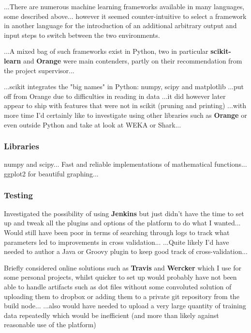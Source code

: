 ...There are numerous machine learning frameworks available in many languages,
some described above... however it seemed counter-intuitive to select a
framework in another language for the introduction of an additional arbitrary
output and input steps to switch between the two environments.

...A mixed bag of such frameworks exist in Python, two in particular
\textbf{scikit-learn}\citep{scikit-learn} and \textbf{Orange}\citep{orange}
were main contenders, partly on their recommendation from the project
supervisor...

...scikit integrates the "big names" in Python: numpy, scipy and matplotlib
...put off from Orange due to difficulties in reading in data ...it did however
later appear to ship with features that were not in scikit (pruning and
printing) ...with more time I'd certainly like to investigate using other
libraries such as \textbf{Orange} or even outside Python and take at look at WEKA
or Shark...

\subsubsection{Libraries}
numpy\citep{numpyscipy} and scipy\citep{scipy}... Fast and reliable implementations of
mathematical functions...  ggplot2\citep{ggplot2} for beautiful graphing...

\subsubsection{Testing}
Investigated the possibility of using \textbf{Jenkins}
but just didn't have the time to set up and tweak all the plugins and options of
the platform to do what I wanted... Would still have been poor in terms of
searching through logs to track what parameters led to improvements in cross
validation... ...Quite likely I'd have needed to author a Java or Groovy plugin
to keep good track of cross-validation...

Briefly considered online solutions such as \textbf{Travis} and \textbf{Wercker}
which I use for some personal projects, whilst quicker to set up would probably
have not been able to handle artifacts such as dot files without some convoluted
solution of uploading them to dropbox or adding them to a private git repository
from the build node...  ...also would have needed to upload a very large
quantity of training data repeatedly which would be inefficient (and more than
likely against reasonable use of the platform)

